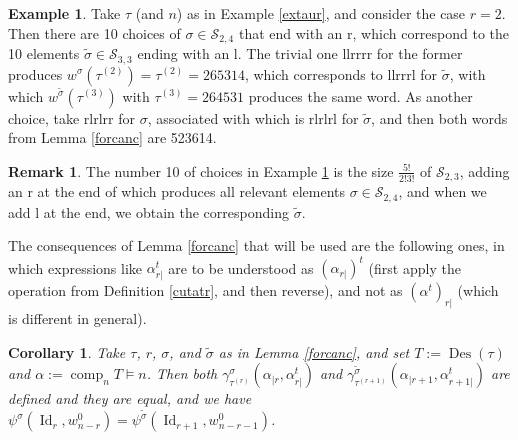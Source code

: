 \documentclass{article}
\newtheorem{cor}[thm]{Corollary}
\theoremstyle{definition}
\newtheorem{rmk}[thm]{Remark}
\newtheorem{ex}[thm]{Example}
\begin{document}
\begin{ex}
Take $\tau$ (and $n$) as in Example \ref{extaur}, and consider the case $r=2$. Then there are 10 choices of $\sigma\in\mathcal{S}_{2,4}$ that end with an r, which correspond to the 10 elements $\tilde{\sigma}\in\mathcal{S}_{3,3}$ ending with an l. The trivial one llrrrr for the former produces $w^{\sigma}(\tau^{(2)})=\tau^{(2)}=265314$, which corresponds to llrrrl for $\tilde{\sigma}$, with which $w^{\tilde{\sigma}}(\tau^{(3)})$ with $\tau^{(3)}=264531$ produces the same word. As another choice, take rlrlrr for $\sigma$, associated with which is rlrlrl for $\tilde{\sigma}$, and then both words from Lemma \ref{forcanc} are 523614. \label{cancex}
\end{ex}

\begin{rmk}
The number 10 of choices in Example \ref{cancex} is the size $\frac{5!}{2!3!}$ of $\mathcal{S}_{2,3}$, adding an r at the end of which produces all relevant elements $\sigma\in\mathcal{S}_{2,4}$, and when we add l at the end, we obtain the corresponding $\tilde{\sigma}$. \label{numofpairs}
\end{rmk}
The consequences of Lemma \ref{forcanc} that will be used are the following ones, in which expressions like $\alpha_{r|}^{t}$ are to be understood as $(\alpha_{r|})^{t}$ (first apply the operation from Definition \ref{cutatr}, and then reverse), and not as $(\alpha^{t})_{r|}$ (which is different in general).
\begin{cor}
Take $\tau$, $r$, $\sigma$, and $\tilde{\sigma}$ as in Lemma \ref{forcanc}, and set $T:=\operatorname{Des}(\tau)$ and $\alpha:=\operatorname{comp}_{n}T \vDash n$. Then both $\gamma^{\sigma}_{\tau^{(r)}}(\alpha_{|r},\alpha_{r|}^{t})$ and $\gamma^{\tilde{\sigma}}_{\tau^{(r+1)}}(\alpha_{|r+1},\alpha_{r+1|}^{t})$ are defined and they are equal, and we have $\psi^{\sigma}(\operatorname{Id}_{r},w^{0}_{n-r})=\psi^{\tilde{\sigma}}(\operatorname{Id}_{r+1},w^{0}_{n-r-1})$. \label{comppars}
\end{cor}
\end{document}
